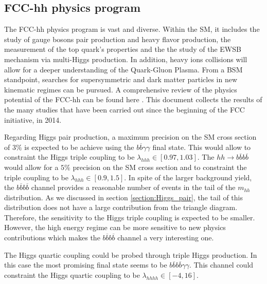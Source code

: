 
\subsection{FCC-hh physics program}

The FCC-hh physics program is vast and diverse. Within the SM, it includes the study of gauge bosons pair production and heavy flavor production, the measurement of the top quark's properties and the the study of the EWSB mechanism via multi-Higgs production. In addition, heavy ions collisions will allow for a deeper understanding of the Quark-Gluon Plasma. From a BSM standpoint, searches for supersymmetric and dark matter particles in new kinematic regimes can be pursued. A comprehensive review of the physics potential of the FCC-hh can be found here \cite{FCCyellow}. This document collects the results of the many studies that have been carried out since the beginning of the FCC initiative, in 2014.

Regarding Higgs pair production, a maximum precision on the SM cross section of $3\%$ is expected to be achieve using the $b\overline{b}\gamma\gamma$ final state. This would allow to constraint the Higgs triple coupling to be $\lambda_{hhh}\in [0.97,1.03]$. The $hh\rightarrow b\overline{b}b\overline{b}$ would allow for a $5\%$ precision on the SM cross section and to constraint the triple coupling to be $\lambda_{hhh}\in [0.9,1.5]$. In spite of the larger background yield, the $b\overline{b}b\overline{b}$ channel provides a reasonable number of events in the tail of the $m_{hh}$ distribution. As we discussed in section \ref{section:Higgs_pair}, the tail of this distribution does not have a large contribution from the triangle diagram. Therefore, the sensitivity to the Higgs triple coupling is expected to be smaller. However, the high energy regime can be more sensitive to new physics contributions which makes the $b\overline{b}b\overline{b}$ channel a very interesting one. 

The Higgs quartic coupling could be probed through triple Higgs production. In this case the most promising final state seems to be $b\overline{b}b\overline{b}\gamma\gamma$. This channel could constraint the Higgs quartic coupling to be $\lambda_{hhhh}\in [-4,16]$.